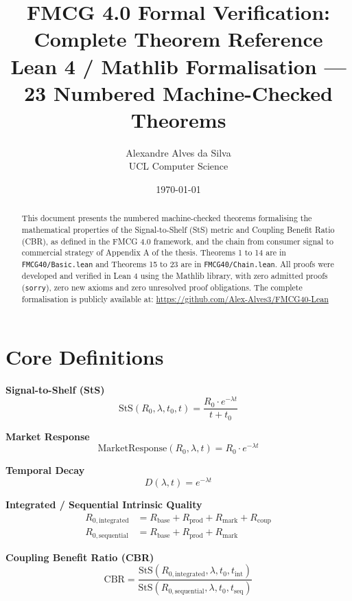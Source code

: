 \documentclass[11pt,a4paper]{article}
\title{FMCG 4.0 Formal Verification:\\ Complete Theorem Reference\\[0.3em]
	\large Lean 4 / Mathlib Formalisation --- 23 Numbered Machine-Checked Theorems}
\author{Alexandre Alves da Silva \\ UCL Computer Science}
\date{\today}
\begin{document}
	
	\maketitle
	
	\begin{abstract}
		\noindent This document presents the numbered machine-checked theorems formalising the mathematical properties of the Signal-to-Shelf (StS) metric and Coupling Benefit Ratio (CBR), as defined in the FMCG 4.0 framework, and the chain from consumer signal to commercial strategy of Appendix A of the thesis. Theorems 1 to 14 are in \texttt{FMCG40/Basic.lean} and Theorems 15 to 23 are in \texttt{FMCG40/Chain.lean}. All proofs were developed and verified in Lean 4 using the Mathlib library, with zero admitted proofs (\texttt{sorry}), zero new axioms and zero unresolved proof obligations. The complete formalisation is publicly available at:
		\url{https://github.com/Alex-Alves3/FMCG40-Lean}
	\end{abstract}
	
	\section*{Core Definitions}
	
	\textbf{Signal-to-Shelf (StS)}
	\begin{equation}
		\text{StS}(R_0, \lambda, t_0, t) = \frac{R_0 \cdot e^{-\lambda t}}{t + t_0}
	\end{equation}
	
	\textbf{Market Response}
	\begin{equation}
		\text{MarketResponse}(R_0, \lambda, t) = R_0 \cdot e^{-\lambda t}
	\end{equation}
	
	\textbf{Temporal Decay}
	\begin{equation}
		D(\lambda, t) = e^{-\lambda t}
	\end{equation}
	
	\textbf{Integrated / Sequential Intrinsic Quality}
	\begin{align}
		R_{0,\text{integrated}} &= R_{\text{base}} + R_{\text{prod}} + R_{\text{mark}} + R_{\text{coup}} \\
		R_{0,\text{sequential}} &= R_{\text{base}} + R_{\text{prod}} + R_{\text{mark}}
	\end{align}
	
	\textbf{Coupling Benefit Ratio (CBR)}
	\begin{equation}
		\text{CBR} = \frac{\text{StS}(R_{0,\text{integrated}}, \lambda, t_0, t_{\text{int}})}{\text{StS}(R_{0,\text{sequential}}, \lambda, t_0, t_{\text{seq}})}
	\end{equation}
	
\end{document}
